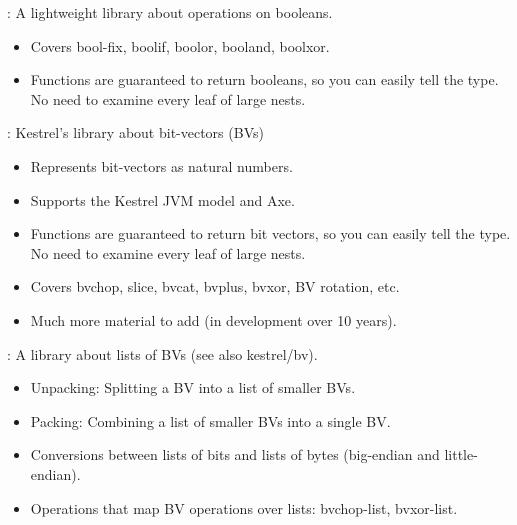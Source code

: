 
\begin{frame}

\newlibtitle

: A lightweight library about operations on booleans.
\begin{itemize}
\item Covers bool-fix, boolif, boolor, booland, boolxor.
\item Functions are guaranteed to return booleans, so you can easily tell the
  type.  No need to examine every leaf of large nests.
\end{itemize}

\end{frame}


\begin{frame}

\newlibtitle

: Kestrel's library about bit-vectors (BVs)
\begin{itemize}
\item Represents bit-vectors as natural numbers.
\item Supports the Kestrel JVM model and Axe.
\item Functions are guaranteed to return bit vectors, so you can easily tell the
  type.  No need to examine every leaf of large nests.
\item Covers bvchop, slice, bvcat, bvplus, bvxor, BV rotation, etc.
\item Much more material to add (in development over 10 years).
\end{itemize}

\end{frame}


\begin{frame}

\newlibtitle

: A library about lists of BVs (see also kestrel/bv).
\begin{itemize}
\item Unpacking: Splitting a BV into a list of smaller BVs.
\item Packing: Combining a list of smaller BVs into a single BV.
\item Conversions between lists of bits and lists of bytes (big-endian and little-endian).
\item Operations that map BV operations over lists: bvchop-list, bvxor-list.
\end{itemize}

\end{frame}


